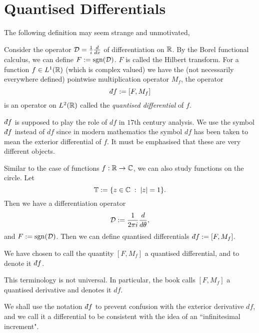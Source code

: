 \section{Quantised Differentials}
The following definition may seem strange and unmotivated,
\begin{definition}
    Consider the operator $\mathcal{D} = \frac{1}{i}\frac{d}{dx}$ of differentiation
    on $\mathbb{R}$. By the Borel functional calculus, we can define $F := \operatorname{sgn}(\mathcal{D})$. 
    $F$ is called the Hilbert transform. For a function $f \in L^1(\mathbb{R})$ (which is
    complex valued)
    we have the (not necessarily everywhere defined) pointwise multiplication
    operator $M_f$, the operator
    \begin{equation}
        \qd f := [F,M_f]
    \end{equation}
    is an operator on $L^2(\mathbb{R})$
    called the \emph{quantised differential} of $f$.
\end{definition}

$\qd f$ is supposed to play the role of $df$ in $17$th century analysis. 
We use the symbol $\qd f$ instead of $df$ since in modern mathematics the symbol $df$
has been taken to mean the exterior differential of $f$. It must be emphasised
that these are very different objects.

Similar to the case of functions $f:\mathbb{R}\rightarrow \mathbb{C}$, we can also
study functions on the circle. Let
\begin{equation}
    \mathbb{T} := \{z \in \mathbb{C}\;:\;|z| = 1\}.
\end{equation}
Then we have a differentiation operator 
\begin{equation}
    \mathcal{D} := \frac{1}{2\pi i} \frac{d}{d\theta},
\end{equation}
and $F := \operatorname{sgn}(\mathcal{D})$. Then we can define quantised
differentials $\qd f := [F,M_f]$. 

\begin{remark}
    We have chosen to call the quantity $[F,M_f]$
    a quantised differential, and to denote it $\qd f$. 
    
    This terminology is not universal. In particular, the book \cite{Connes94}
    calls $[F,M_f]$ a quantised derivative and denotes it $df$. 
    
    We shall use the notation $\qd f$ to prevent confusion with the exterior
    derivative $df$, and we call it a differential to be consistent
    with the idea of an ``infinitesimal increment".
\end{remark}    


